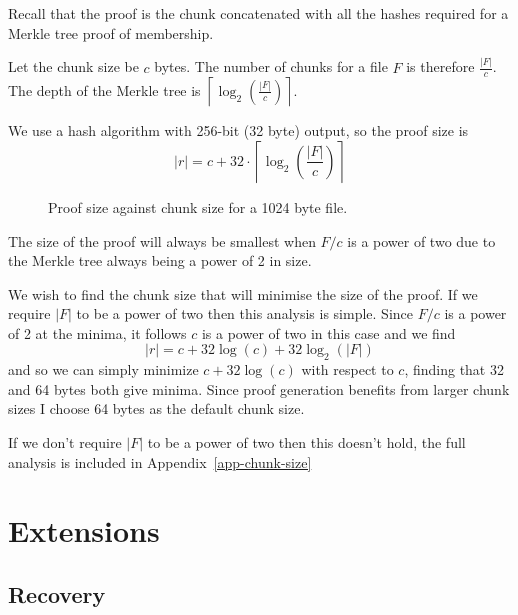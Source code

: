\documentclass[12pt,a4paper,twoside,openright]{report}
\begin{document}
Recall that the proof is the chunk concatenated with all the hashes required for a Merkle tree proof of membership.

Let the chunk size be $c$ bytes.
The number of chunks for a file $F$ is therefore $\frac{|F|}{c}$.
The depth of the Merkle tree is $\left\lceil\log_2\left(\frac{|F|}{c}\right)\right\rceil$.

We use a hash algorithm with 256-bit (32 byte) output, so the proof size is
\[|r| = c + 32 \cdot \left\lceil\log_2\left(\frac{|F|}{c}\right)\right\rceil\]

\begin{figure}[h]
\caption[Chunk size graph]{Proof size against chunk size for a 1024 byte file.}
\label{eval-graph-chunk-size}
\end{figure}


The size of the proof will always be smallest when $F/c$ is a power of two due to the Merkle tree always being a power of 2 in size.

We wish to find the chunk size that will minimise the size of the proof.
If we require $|F|$ to be a power of two then this analysis is simple.
Since $F/c$ is a power of 2 at the minima, it follows $c$ is a power of two in this case and we find
\[|r| = c + 32\log(c) + 32\log_2(|F|)\]
and so we can simply minimize $c + 32\log(c)$ with respect to $c$, finding that 32 and 64 bytes both give minima.
Since proof generation benefits from larger chunk sizes I choose 64 bytes as the default chunk size.

If we don't require $|F|$ to be a power of two then this doesn't hold, the full analysis is included in Appendix~\ref{app-chunk-size}

\section{Extensions}


\subsection{Recovery}
\end{document}
